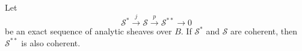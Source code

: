 Let
$$
\mathcal{S}^* \xrightarrow{j} \mathcal{S} \xrightarrow{p} \mathcal{S}^{**} \longrightarrow 0
$$
be an exact sequence of analytic sheaves over $B$. If $\mathcal{S}^*$ and $\mathcal{S}$ are coherent, then $\mathcal{S}^{**}$ is also coherent.
